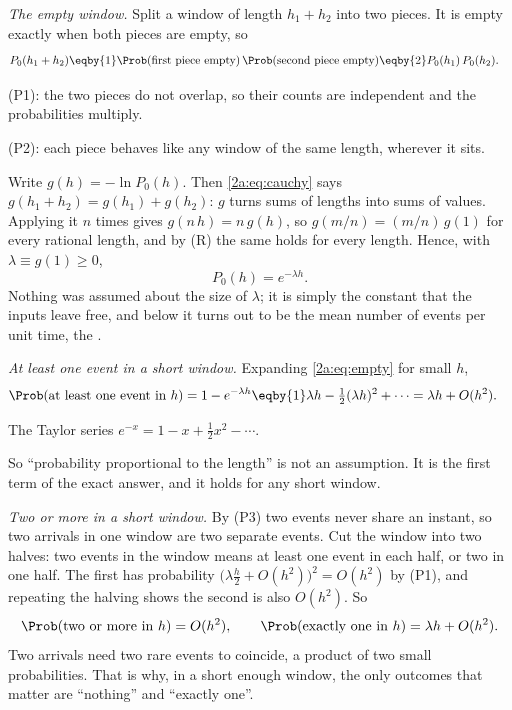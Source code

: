 \emph{The empty window.} Split a window of length $h_1+h_2$ into two pieces. It
is empty exactly when both pieces are empty, so
\begin{align}
  P_0(h_1+h_2)
  &\eqby{1} \Prob(\text{first piece empty})\,\Prob(\text{second piece empty})
   \eqby{2} P_0(h_1)\,P_0(h_2).
  \label{2a:eq:cauchy}
\end{align}
\begin{explain}
  \item (P1): the two pieces do not overlap, so their counts are independent and the probabilities multiply.
  \item (P2): each piece behaves like any window of the same length, wherever it sits.
\end{explain}
Write $g(h)=-\ln P_0(h)$. Then \eqref{2a:eq:cauchy} says $g(h_1+h_2)=g(h_1)+g(h_2)$:
$g$ turns sums of lengths into sums of values. Applying it $n$ times gives
$g(n\,h)=n\,g(h)$, so $g(m/n)=(m/n)\,g(1)$ for every rational length, and by (R) the
same holds for every length. Hence, with $\lambda\equiv g(1)\ge0$,
\begin{equation}
  P_0(h)=e^{-\lambda h}.
  \label{2a:eq:empty}
\end{equation}
Nothing was assumed about the size of $\lambda$; it is simply the constant that
the inputs leave free, and below it turns out to be the mean number of events per
unit time, the .

\emph{At least one event in a short window.} Expanding \eqref{2a:eq:empty} for small $h$,
\begin{align*}
  \Prob(\text{at least one event in }h)
  &= 1-e^{-\lambda h}
   \eqby{1} \lambda h-\tfrac12(\lambda h)^2+\cdots
   = \lambda h+O(h^2).
\end{align*}
\begin{explain}
  \item The Taylor series $e^{-x}=1-x+\tfrac12x^2-\cdots$.
\end{explain}
So ``probability proportional to the length'' is not an assumption. It is the
first term of the exact answer, and it holds for any short window.

\emph{Two or more in a short window.} By (P3) two events never share an instant,
so two arrivals in one window are two separate events. Cut the window into two
halves: two events in the window means at least one event in each half, or two
in one half. The first has probability
$\bigl(\lambda\tfrac h2+O(h^2)\bigr)^2=O(h^2)$ by (P1), and repeating the halving
shows the second is also $O(h^2)$. So
\begin{equation*}
  \Prob(\text{two or more in }h)=O(h^2),\qquad
  \Prob(\text{exactly one in }h)=\lambda h+O(h^2).
\end{equation*}
Two arrivals need two rare events to coincide, a product of two small
probabilities. That is why, in a short enough window, the only outcomes that
matter are ``nothing'' and ``exactly one''.

